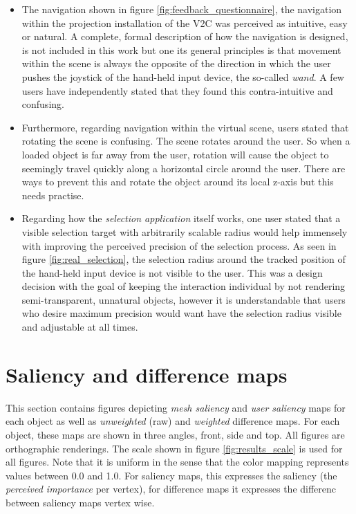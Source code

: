 \begin{itemize}
	\item The navigation shown in figure \ref{fig:feedback_questionnaire}, the navigation within the projection installation of the V2C was perceived as intuitive, easy or natural. A complete, formal description of how the navigation is designed, is not included in this work but one its general principles is that movement within the scene is always the opposite of the direction in which the user pushes the joystick of the hand-held input device, the so-called \textit{wand}. A few users have independently stated that they found this contra-intuitive and confusing.
	\item Furthermore, regarding navigation within the virtual scene, users stated that rotating the scene is confusing. The scene rotates around the user. So when a loaded object is far away from the user, rotation will cause the object to seemingly travel quickly along a horizontal circle around the user. There are ways to prevent this and rotate the object around its local z-axis but this needs practise.
	\item Regarding how the \textit{selection application} itself works, one user stated that a visible selection target with arbitrarily scalable radius would help immensely with improving the perceived precision of the selection process. As seen in figure \ref{fig:real_selection}, the selection radius around the tracked position of the hand-held input device is not visible to the user. This was a design decision with the goal of keeping the interaction individual by not rendering semi-transparent, unnatural objects, however it is understandable that users who desire maximum precision would want have the selection radius visible and adjustable at all times.
\end{itemize}

	\section{Saliency and difference maps}
	\label{sec:saliency_and_difference_maps}
This section contains figures depicting \textit{mesh saliency} and \textit{user saliency} maps for each object as well as \textit{unweighted} (raw) and \textit{weighted} difference maps. For each object, these maps are shown in three angles, front, side and top. All figures are orthographic renderings. The scale shown in figure \ref{fig:results_scale} is used for all figures. Note that it is uniform in the sense that the color mapping represents values between 0.0 and 1.0. For saliency maps, this expresses the saliency (the \textit{perceived importance} per vertex), for difference maps it expresses the differenc between saliency maps vertex wise.

